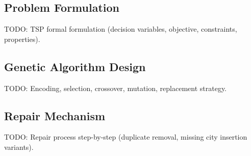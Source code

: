 %

\subsection{Problem Formulation}
TODO: TSP formal formulation (decision variables, objective, constraints, properties).

\subsection{Genetic Algorithm Design}
TODO: Encoding, selection, crossover, mutation, replacement strategy.

\subsection{Repair Mechanism}
TODO: Repair process step-by-step (duplicate removal, missing city insertion variants).
